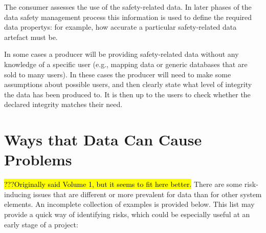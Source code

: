 The consumer assesses the use of the safety-related data. In later phases of the data safety management process this \gls{information} is used to define the required \glspl{data property}: for example, how accurate a particular safety-related \gls{data artefact} must be.

In some cases a producer will be providing safety-related data without any knowledge of a specific user (e.g., mapping data or generic \glspl{database} that are sold to many users). In these cases the producer will need to make some assumptions about possible users, and then clearly state what level of \gls{integrity} the data has been produced to. It is then up to the users to check whether the declared \gls{integrity} matches their need.

\section{Ways that Data Can Cause Problems}
\label{bkm:issues}
\hl{???Originally said Volume 1, but it seems to fit here better.}
There are some risk-inducing issues that are different or more prevalent for data than for other system elements. An incomplete collection of examples is provided below. This list may provide a quick way of identifying risks, which could be especially useful at an early stage of a project:

